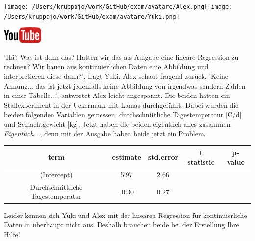\documentclass[a4paper, 9pt]{scrartcl}\usepackage[]{graphicx}\usepackage[]{xcolor}
\begin{document}
 
\begin{minipage}[t]{0.5\textwidth}
\texttt{[image: /Users/kruppajo/work/GitHub/exam/avatare/Alex.png]}\hspace{-4mm}\texttt{[image: /Users/kruppajo/work/GitHub/exam/avatare/Yuki.png]}
\end{minipage}
\begin{minipage}[t]{0.5\textwidth}
\hfill
\href{https://youtu.be/lJp8rFmMnrs}{\includegraphics[width = 2cm]{img/youtube}}
\end{minipage}
\vspace{1ex}



'Hä? Was ist denn das? Hatten wir das als Aufgabe eine lineare Regression zu rechnen? Wir bauen aus kontinuierlichen Daten eine Abbildung und interpretieren diese dann?', fragt Yuki. Alex schaut fragend zurück. 'Keine Ahnung... das ist jetzt jedenfalls keine Abbildung von irgendwas sondern Zahlen in einer Tabelle...', antwortet Alex leicht angespannt. Die beiden hatten ein Stallexperiment in der Uckermark mit Lamas durchgeführt. Dabei wurden die beiden folgenden Variablen gemessen: durchschnittliche Tagestemperatur [C/d] und Schlachtgewicht [kg]. Jetzt haben die beiden eigentlich alles zusammen. \textit{Eigentlich...}, denn mit der \Rlogo Ausgabe haben beide jetzt ein Problem.

\begin{table}[!h]
\centering\begingroup\fontsize{12}{14}\selectfont

\begin{tabular}{ccccc}
\toprule
term & estimate & std.error & t statistic & p-value\\
\midrule
(Intercept) & 5.97 & 2.66 &  & \\
Durchschnittliche Tagestemperatur & -0.30 & 0.27 &  & \\
\bottomrule
\end{tabular}
\endgroup{}
\end{table}



Leider kennen sich Yuki und Alex mit der linearen Regression für kontinuierliche Daten in \Rlogo überhaupt nicht aus. Deshalb brauchen beide bei der Erstellung Ihre Hilfe!
\end{document}
